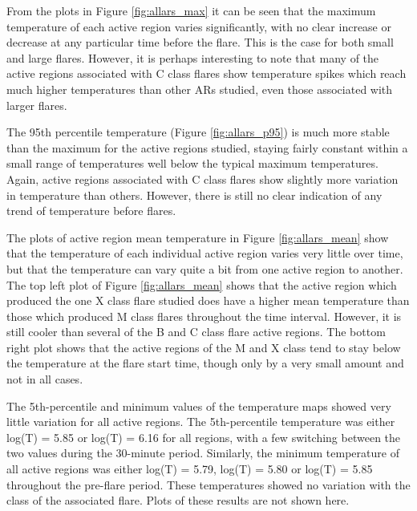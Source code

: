 \documentclass[referee,a4paper,12pt]{swsc}
\begin{document}
\begin{linenumbers}
From the plots in Figure \ref{fig:allars_max} it can be seen that the maximum temperature of each active region varies significantly, with no clear increase or decrease at any particular time before the flare.
This is the case for both small and large flares.
However, it is perhaps interesting to note that many of the active regions associated with C class flares show temperature spikes which reach much higher temperatures than other ARs studied, even those associated with larger flares.

The 95th percentile temperature (Figure \ref{fig:allars_p95}) is much more stable than the maximum for the active regions studied, staying fairly constant within a small range of temperatures well below the typical maximum temperatures.
Again, active regions associated with C class flares show slightly more variation in temperature than others.
However, there is still no clear indication of any trend of temperature before flares.

The plots of active region mean temperature in Figure \ref{fig:allars_mean} show that the temperature of each individual active region varies very little over time, but that the temperature can vary quite a bit from one active region to another.
The top left plot of Figure \ref{fig:allars_mean} shows that the active region which produced the one X class flare studied does have a higher mean temperature than those which produced M class flares throughout the time interval.
However, it is still cooler than several of the B and C class flare active regions.
The bottom right plot shows that the active regions of the M and X class tend to stay below the temperature at the flare start time, though only by a very small amount and not in all cases.

The 5th-percentile and minimum values of the temperature maps showed very little variation for all active regions.
The 5th-percentile temperature was either log(T) = 5.85 or log(T) = 6.16 for all regions, with a few switching between the two values during the 30-minute period.
Similarly, the minimum temperature of all active regions was either log(T) = 5.79, log(T) = 5.80 or log(T) = 5.85 throughout the pre-flare period.
These temperatures showed no variation with the class of the associated flare.
Plots of these results are not shown here.


\end{linenumbers}
\end{document}
